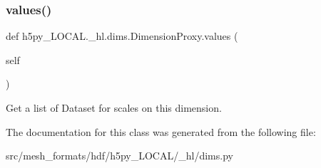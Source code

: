 \subsubsection{\texorpdfstring{values()}{values()}}
{\footnotesize\ttfamily def h5py\+\_\+\+L\+O\+C\+A\+L.\+\_\+hl.\+dims.\+Dimension\+Proxy.\+values (\begin{DoxyParamCaption}\item[{}]{self }\end{DoxyParamCaption})}

\begin{DoxyVerb}Get a list of Dataset for scales on this dimension. \end{DoxyVerb}
 

The documentation for this class was generated from the following file\+:\begin{DoxyCompactItemize}
\item 
src/mesh\+\_\+formats/hdf/h5py\+\_\+\+L\+O\+C\+A\+L/\+\_\+hl/dims.\+py\end{DoxyCompactItemize}
